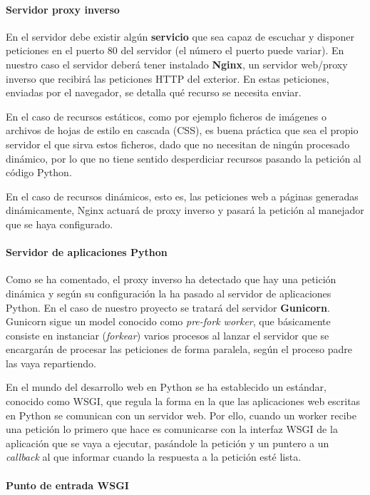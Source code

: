 \paragraph{Servidor proxy inverso}

En el servidor debe existir algún \textbf{servicio} que sea capaz de escuchar y
disponer peticiones en el puerto 80 del servidor (el número el puerto puede
variar). En nuestro caso el servidor deberá tener instalado \textbf{Nginx}, un
servidor web/proxy inverso que recibirá las peticiones HTTP del exterior. En
estas peticiones, enviadas por el navegador, se detalla qué recurso se necesita
enviar. 

En el caso de recursos estáticos, como por ejemplo ficheros de imágenes o
archivos de hojas de estilo en cascada (\ac{CSS}), es buena práctica que sea el
propio servidor el que sirva estos ficheros, dado que no necesitan de ningún
procesado dinámico, por lo que no tiene sentido desperdiciar recursos pasando la
petición al código Python.

En el caso de recursos dinámicos, esto es, las peticiones web a páginas
generadas dinámicamente, Nginx actuará de proxy inverso y pasará la petición al
manejador que se haya configurado. 

\paragraph{Servidor de aplicaciones Python}

Como se ha comentado, el proxy inverso ha detectado que hay una petición
dinámica y según su configuración la ha pasado al servidor de aplicaciones
Python. En el caso de nuestro proyecto se tratará del servidor
\textbf{Gunicorn}. Gunicorn sigue un model conocido como \textit{pre-fork
  worker}, que básicamente consiste en instanciar (\textit{forkear}) varios
procesos al lanzar el servidor que se encargarán de procesar las peticiones de
forma paralela, según el proceso padre las vaya repartiendo.

En el mundo del desarrollo web en Python se ha establecido un estándar, conocido
como \ac{WSGI}, que regula la forma en la que las aplicaciones web escritas en
Python se comunican con un servidor web. Por ello, cuando un worker recibe una
petición lo primero que hace es comunicarse con la interfaz WSGI de la
aplicación que se vaya a ejecutar, pasándole la petición y un puntero a un
\textit{callback} al que informar cuando la respuesta a la petición esté
lista. 

\paragraph{Punto de entrada WSGI}

